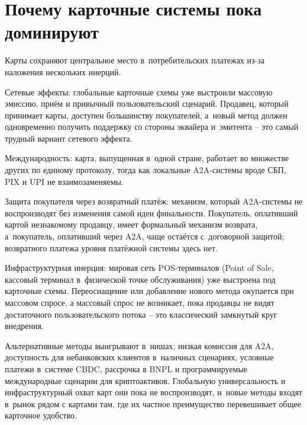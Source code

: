 
\section{Почему карточные системы пока доминируют}\label{sec:card-dominance}

Карты сохраняют центральное место в~потребительских платежах из-за
наложения нескольких инерций.

Сетевые эффекты: глобальные карточные
схемы уже выстроили массовую эмиссию, приём и привычный пользовательский
сценарий. Продавец, который принимает карты, доступен
большинству покупателей, а~новый метод должен одновременно получить
поддержку со стороны эквайера и~эмитента -- это самый трудный вариант
сетевого эффекта.

Международность: карта, выпущенная в~одной стране,
работает во множестве других по единому протоколу, тогда как локальные
A2A-системы вроде СБП, PIX и UPI не взаимозаменяемы.

Защита покупателя через возвратный платёж: механизм, который A2A-системы не воспроизводят без изменения самой идеи финальности.
Покупатель, оплативший картой незнакомому продавцу, имеет формальный
механизм возврата, а~покупатель, оплативший через A2A, чаще остаётся
с~договорной защитой; возвратного платежа уровня платёжной системы
здесь нет.

Инфраструктурная инерция: мировая сеть
POS-терминалов (Point of Sale, кассовый терминал в~физической точке
обслуживания) уже выстроена под карточные схемы. Переоснащение
или добавление нового метода окупается при массовом спросе, а
массовый спрос не возникает, пока продавцы не видят достаточного
пользовательского потока -- это классический замкнутый круг внедрения.

Альтернативные методы выигрывают в~нишах: низкая комиссия для
A2A, доступность для небанковских клиентов в~наличных сценариях,
условные платежи в~системе CBDC, рассрочка в BNPL и программируемые
международные сценарии для криптоактивов. Глобальную
универсальность и инфраструктурный охват карт они пока не
воспроизводят, и~новые методы входят в~рынок рядом с
картами там, где их частное преимущество
перевешивает общее карточное удобство.

